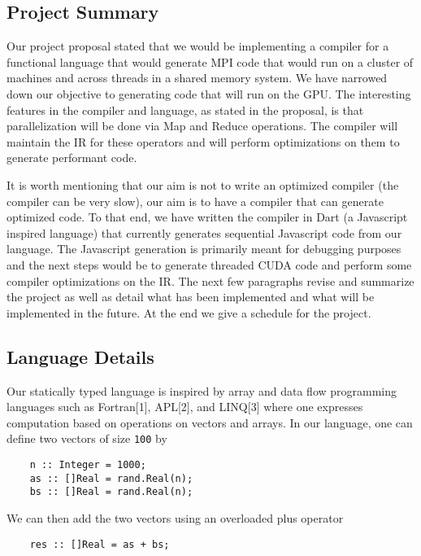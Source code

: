 \subsection{Project Summary}\label{project-summary}

Our project proposal stated that we would be implementing a compiler for
a functional language that would generate MPI code that would run on a
cluster of machines and across threads in a shared memory system. We
have narrowed down our objective to generating code that will run on the
GPU. The interesting features in the compiler and language, as stated in
the proposal, is that parallelization will be done via Map and Reduce
operations. The compiler will maintain the IR for these operators and
will perform optimizations on them to generate performant code.

It is worth mentioning that our aim is not to write an optimized
compiler (the compiler can be very slow), our aim is to have a compiler
that can generate optimized code. To that end, we have written the
compiler in Dart (a Javascript inspired language) that currently
generates sequential Javascript code from our language. The Javascript
generation is primarily meant for debugging purposes and the next steps
would be to generate threaded CUDA code and perform some compiler
optimizations on the IR. The next few paragraphs revise and summarize
the project as well as detail what has been implemented and what will be
implemented in the future. At the end we give a schedule for the
project.

\subsection{Language Details}\label{language-details}

Our statically typed language is inspired by array and data flow
programming languages such as Fortran{[}1{]}, APL{[}2{]}, and
LINQ{[}3{]} where one expresses computation based on operations on
vectors and arrays. In our language, one can define two vectors of size
\texttt{100} by

\begin{verbatim}
    n :: Integer = 1000;
    as :: []Real = rand.Real(n);
    bs :: []Real = rand.Real(n); 
\end{verbatim}

We can then add the two vectors using an overloaded plus operator

\begin{verbatim}
    res :: []Real = as + bs;
\end{verbatim}


